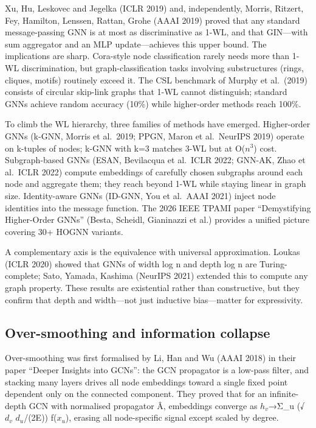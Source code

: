 Xu, Hu, Leskovec and Jegelka (ICLR 2019) and, independently, Morris, Ritzert, Fey, Hamilton, Lenssen, Rattan, Grohe (AAAI 2019) proved that any standard message-passing GNN is at most as discriminative as 1-WL, and that GIN---with sum aggregator and an MLP update---achieves this upper bound. The implications are sharp. Cora-style node classification rarely needs more than 1-WL discrimination, but graph-classification tasks involving substructures (rings, cliques, motifs) routinely exceed it. The CSL benchmark of Murphy et al.~(2019) consists of circular skip-link graphs that 1-WL cannot distinguish; standard GNNs achieve random accuracy (10\%) while higher-order methods reach 100\%.

To climb the WL hierarchy, three families of methods have emerged. Higher-order GNNs (k-GNN, Morris et al.~2019; PPGN, Maron et al.~NeurIPS 2019) operate on k-tuples of nodes; k-GNN with k=3 matches 3-WL but at O(\(n^3\)) cost. Subgraph-based GNNs (ESAN, Bevilacqua et al.~ICLR 2022; GNN-AK, Zhao et al.~ICLR 2022) compute embeddings of carefully chosen subgraphs around each node and aggregate them; they reach beyond 1-WL while staying linear in graph size. Identity-aware GNNs (ID-GNN, You et al.~AAAI 2021) inject node identities into the message function. The 2026 IEEE TPAMI paper ``Demystifying Higher-Order GNNs'' (Besta, Scheidl, Gianinazzi et al.) provides a unified picture covering 30+ HOGNN variants.

A complementary axis is the equivalence with universal approximation. Loukas (ICLR 2020) showed that GNNs of width log n and depth log n are Turing-complete; Sato, Yamada, Kashima (NeurIPS 2021) extended this to compute any graph property. These results are existential rather than constructive, but they confirm that depth and width---not just inductive bias---matter for expressivity.

\subsection{Over-smoothing and information collapse}\label{over-smoothing-and-information-collapse}

Over-smoothing was first formalised by Li, Han and Wu (AAAI 2018) in their paper ``Deeper Insights into GCNs'': the GCN propagator is a low-pass filter, and stacking many layers drives all node embeddings toward a single fixed point dependent only on the connected component. They proved that for an infinite-depth GCN with normalised propagator Â, embeddings converge as \(h_v\)→Σ\_u (√\(d_v\) \(d_u\)/(2\textbar E\textbar)) f(\(x_u\)), erasing all node-specific signal except scaled by degree.

